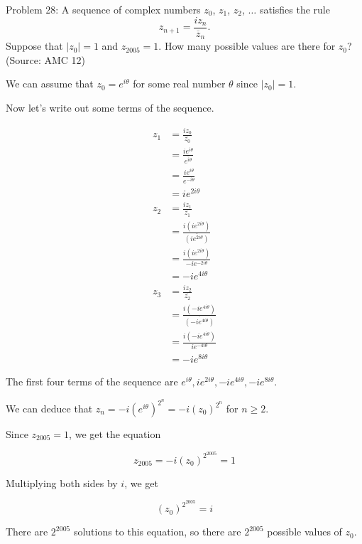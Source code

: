 Problem 28: A sequence of complex numbers $z_0$, $z_1$, $z_2$, $\ldots$ satisfies the rule \[z_{n + 1} = \frac{iz_n}{\overline{z}_n}.\] Suppose that $|z_0| = 1$ and $z_{2005} = 1$. How many possible values are there for $z_0$? (Source: AMC 12)

We can assume that $z_0 = e^{i\theta}$ for some real number $\theta$ since $|z_0| = 1$.

Now let's write out some terms of the sequence.

\begin{align*}
z_1 &= \frac{iz_0}{\overline{z_0}} \\
&= \frac{ie^{i\theta}}{\overline{e^{i\theta}}} \\
&= \frac{ie^{i\theta}}{e^{-i\theta}} \\
&= ie^{2i\theta} \\
z_2 &= \frac{iz_1}{\overline{z_1}} \\
&= \frac{i(ie^{2i\theta})}{\overline{(ie^{2i\theta})}} \\
&= \frac{i(ie^{2i\theta})}{-ie^{-2i\theta}} \\
&= -ie^{4i \theta} \\
z_3 &= \frac{iz_2}{\overline{z_2}} \\
&= \frac{i(-ie^{4i \theta})}{\overline{(-ie^{4i \theta})}} \\
&= \frac{i(-ie^{4i \theta})}{ie^{-4i\theta}} \\
&= -ie^{8i \theta}
\end{align*}

The first four terms of the sequence are $e^{i\theta}, ie^{2i\theta}, -ie^{4i \theta}, -ie^{8i \theta}$.

We can deduce that $z_n = -i(e^{i\theta})^{2^n} = -i(z_0)^{2^n}$ for $n \geq 2$.

Since $z_{2005} = 1$, we get the equation

$$ z_{2005} = -i(z_0)^{2^{2005}} = 1 $$

Multiplying both sides by $i$, we get

$$ (z_0)^{2^{2005}} = i $$

There are $2^{2005}$ solutions to this equation, so there are $\boxed{2^{2005}}$ possible values of $z_0$.
